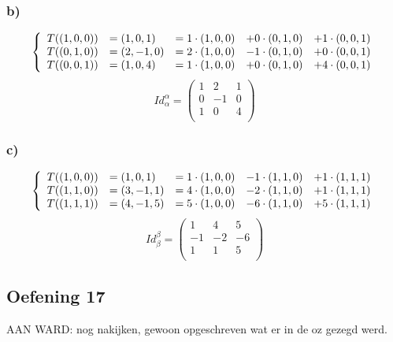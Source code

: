 \documentclass[lineaire_algebra_oplossingen.tex]{subfiles}
\begin{document}
\subsubsection*{b)}
\[
\left\lbrace
\begin{array}{c l c c c}
T((1,0,0)) &= (1,0,1) &= 1\cdot (1,0,0) &+ 0\cdot (0,1,0) &+ 1\cdot (0,0,1) \\
T((0,1,0)) &= (2,-1,0)&= 2\cdot (1,0,0) &- 1\cdot (0,1,0) &+ 0\cdot (0,0,1)\\
T((0,0,1)) &= (1,0,4) &= 1\cdot (1,0,0) &+ 0\cdot (0,1,0) &+ 4\cdot (0,0,1)\\ 
\end{array}
\right.
\]
\[
Id_\alpha^\alpha = 
\begin{pmatrix}
1 & 2 & 1\\
0 & -1 & 0\\
1 & 0 & 4\\
\end{pmatrix}
\]

\subsubsection*{c)}
\[
\left\lbrace
\begin{array}{c l c c c}
T((1,0,0)) &= (1,0,1) &= 1\cdot (1,0,0) &- 1\cdot (1,1,0) &+ 1\cdot (1,1,1)\\
T((1,1,0)) &= (3,-1,1)&= 4\cdot (1,0,0) &- 2\cdot (1,1,0) &+ 1\cdot (1,1,1)\\
T((1,1,1)) &= (4,-1,5)&= 5\cdot (1,0,0) &- 6\cdot (1,1,0) &+ 5\cdot (1,1,1)\\
\end{array}
\right.
\]
\[
Id_\beta^\beta = 
\begin{pmatrix}
1 & 4 & 5\\
-1 & -2 & -6\\
1 & 1 & 5\\
\end{pmatrix}
\]

\subsection{Oefening 17}
AAN WARD: nog nakijken, gewoon opgeschreven wat er in de oz gezegd werd.
\end{document}
